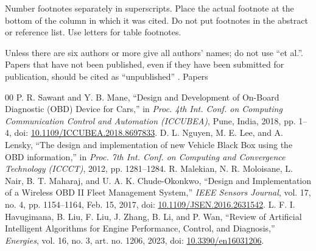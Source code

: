 \documentclass[conference]{IEEEtran}
\begin{document}
Number footnotes separately in superscripts. Place the actual footnote at 
the bottom of the column in which it was cited. Do not put footnotes in the 
abstract or reference list. Use letters for table footnotes.

Unless there are six authors or more give all authors' names; do not use 
``et al.''. Papers that have not been published, even if they have been 
submitted for publication, should be cited as ``unpublished'' \cite{b4}. Papers 


\begin{thebibliography}{00}
 P. R. Sawant and Y. B. Mane, ``Design and Development of On-Board Diagnostic (OBD) Device for Cars,'' in \textit{Proc. 4th Int. Conf. on Computing Communication Control and Automation (ICCUBEA)}, Pune, India, 2018, pp. 1--4, doi: \href{https://doi.org/10.1109/ICCUBEA.2018.8697833}{10.1109/ICCUBEA.2018.8697833}.
 D. L. Nguyen, M. E. Lee, and A. Lensky, ``The design and implementation of new Vehicle Black Box using the OBD information,'' in \textit{Proc. 7th Int. Conf. on Computing and Convergence Technology (ICCCT)}, 2012, pp. 1281--1284.
 R. Malekian, N. R. Moloisane, L. Nair, B. T. Maharaj, and U. A. K. Chude-Okonkwo, ``Design and Implementation of a Wireless OBD II Fleet Management System,'' \textit{IEEE Sensors Journal}, vol. 17, no. 4, pp. 1154--1164, Feb. 15, 2017, doi: \href{https://doi.org/10.1109/JSEN.2016.2631542}{10.1109/JSEN.2016.2631542}.
 L. F. I. Havugimana, B. Liu, F. Liu, J. Zhang, B. Li, and P. Wan, ``Review of Artificial Intelligent Algorithms for Engine Performance, Control, and Diagnosis,'' \textit{Energies}, vol. 16, no. 3, art. no. 1206, 2023, doi: \href{https://doi.org/10.3390/en16031206}{10.3390/en16031206}.

\end{thebibliography}
\end{document}
